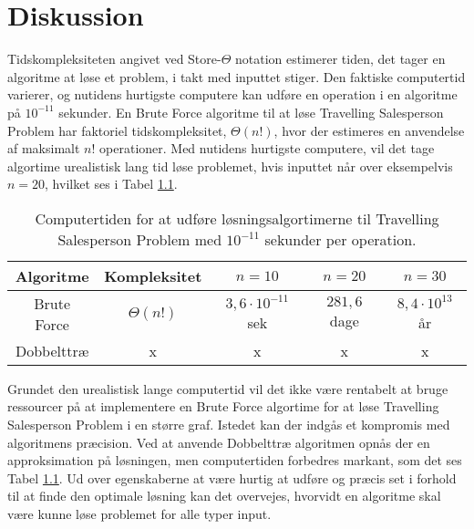 \chapter{Diskussion}

Tidskompleksiteten angivet ved Store-$\Theta$ notation estimerer tiden, det tager en algoritme at løse et problem, i takt med inputtet stiger. 
Den faktiske computertid varierer, og nutidens hurtigste computere kan udføre en operation i en algoritme på $10^{-11}$ sekunder.
En Brute Force algoritme til at løse Travelling Salesperson Problem har faktoriel tidskompleksitet, $\Theta(n!)$, hvor der estimeres en anvendelse af maksimalt $n!$ operationer.
Med nutidens hurtigste computere, vil det tage algortime urealistisk lang tid løse problemet, hvis inputtet når over eksempelvis $n=20$, hvilket ses i Tabel \ref{tab_algtsp}.

\begin{table}[h]
 \centering
  \begin{tabular}{|c|c|c|c|c|}
   \hline
   Algoritme & Kompleksitet & $n=10$ & $n=20$ & $n=30$\\
   \hline
   Brute Force & $\Theta(n!)$ & $3,6 \cdot 10^{-11}$ sek & $281,6$ dage & $8,4 \cdot 10^{13}$ år \\
   \hline
   Dobbelttræ & x & x & x & x \\
   \hline
  \end{tabular}
 \caption{Computertiden for at udføre løsningsalgortimerne til Travelling Salesperson Problem med $10^{-11}$ sekunder per operation.} \label{tab_algtsp}
\end{table}

Grundet den urealistisk lange computertid vil det ikke være rentabelt at bruge ressourcer på at implementere en Brute Force algortime for at løse Travelling Salesperson Problem i en større graf. 
Istedet kan der indgås et kompromis med algoritmens præcision. Ved at anvende Dobbelttræ algoritmen opnås der en approksimation på løsningen, men computertiden forbedres markant, som det ses Tabel \ref{tab_algtsp}.  
Ud over egenskaberne at være hurtig at udføre og præcis set i forhold til at finde den optimale løsning kan det overvejes, hvorvidt en algoritme skal være kunne løse problemet for alle typer input.